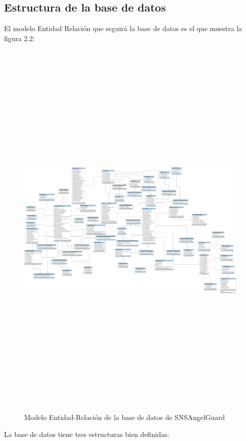 \subsection{Estructura de la base de datos}
El modelo Entidad Relación que seguirá la base de datos es el que muestra la figura 2.2:
\bigskip
\par
\begin{figure}
\begin{center}
\includegraphics[width=17cm,height=19cm]{Figuras/lastModelSocialNetworkDB.png}
\end{center}
\caption{\label{ModeloER} Modelo Entidad-Relación de la base de datos de SNSAngelGuard}
\end{figure}
\bigskip
\par
La base de datos tiene tres estructuras bien definidas:
